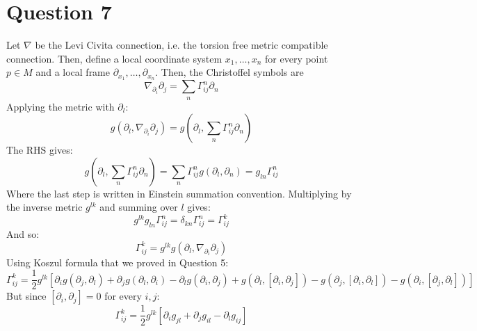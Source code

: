 \documentclass{article}
\begin{document}
\section*{Question 7}
Let $\nabla$ be the Levi Civita connection, i.e. the torsion free metric compatible connection. Then, define a local coordinate system $x_1, \dots, x_n$ for every point $p \in M$ and a local frame $\partial_{x_1},\dots, \partial_{x_n}$. Then, the Christoffel symbols are
\begin{equation}
    \nabla_{\partial_i} \partial_j = \sum_n \Gamma^{n}_{ij} \partial_n
\end{equation}
Applying the metric with $\partial_l$:
\begin{equation}
    g\left(\partial_l, \nabla_{\partial_i} \partial_j\right) = g\left(\partial_l, \sum_n \Gamma^{n}_{ij} \partial_n\right)
\end{equation}
The RHS gives:
\begin{equation}
    g\left(\partial_l, \sum_n \Gamma^{n}_{ij} \partial_n\right) = \sum_n \Gamma^{n}_{ij} g(\partial_l, \partial_n) = g_{ln}\Gamma^{n}_{ij}
\end{equation}
Where the last step is written in Einstein summation convention. Multiplying by the inverse metric $g^{lk}$ and summing over $l$ gives:
\begin{equation}
    g^{lk} g_{ln}\Gamma^{n}_{ij} = \delta_{kn}\Gamma^{n}_{ij} = \Gamma^{k}_{ij}
\end{equation}
And so:
\begin{equation}
    \Gamma^{k}_{ij} = g^{lk} g\left(\partial_l, \nabla_{\partial_i} \partial_j\right)
\end{equation}
Using Koszul formula that we proved in Question 5:
\begin{equation}
    \Gamma^{k}_{ij} = \frac{1}{2}g^{lk} \left[
        \partial_i g(\partial_j,\partial_l) +
        \partial_j g(\partial_l,\partial_i) -
        \partial_l g(\partial_i,\partial_j) +
        g(\partial_l, [\partial_i, \partial_j]) -
        g(\partial_j, [\partial_i, \partial_l]) -
        g(\partial_i, [\partial_j, \partial_l])
    \right]
\end{equation}
But since $[\partial_i, \partial_j] = 0$ for every $i, j$:
\begin{equation}
    \Gamma^{k}_{ij} = \frac{1}{2}g^{lk} \left[
        \partial_i g_{jl} +
        \partial_j g_{il} -
        \partial_l g_{ij}
    \right]
\end{equation}
\end{document}
